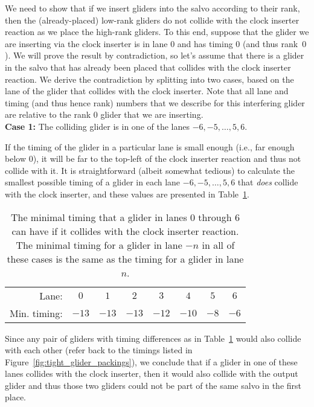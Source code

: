 We need to show that if we insert gliders into the salvo according to their rank, then the (already-placed) low-rank gliders do not collide with the clock inserter reaction as we place the high-rank gliders. To this end, suppose that the glider we are inserting via the clock inserter is in lane $0$ and has timing $0$ (and thus rank~$0$). We will prove the result by contradiction, so let's assume that there is a glider in the salvo that has already been placed that collides with the clock inserter reaction. We derive the contradiction by splitting into two cases, based on the lane of the glider that collides with the clock inserter. Note that all lane and timing (and thus hence rank) numbers that we describe for this interfering glider are relative to the rank $0$ glider that we are inserting. \\

\noindent \textbf{Case 1:} The colliding glider is in one of the lanes $-6, -5, \ldots, 5, 6$.

If the timing of the glider in a particular lane is small enough (i.e., far enough below $0$), it will be far to the top-left of the clock inserter reaction and thus not collide with it. It is straightforward (albeit somewhat tedious) to calculate the smallest possible timing of a glider in each lane $-6, -5, \ldots, 5, 6$ that \emph{does} collide with the clock inserter, and these values are presented in Table~\ref{tab:clock_inserter_ranks}.

\begin{table}[!htb]
	\begin{center}		
		\begin{tabular}{r c c c c c c c}
			\toprule
			Lane: & $0$ & $1$ & $2$ & $3$ & $4$ & $5$ & $6$ \\
			\rowcolor{gray!20} Min. timing: & $-13$ & $-13$ & $-13$ & $-12$ & $-10$ & $-8$ & $-6$ \\\bottomrule
		\end{tabular}
		\caption{The minimal timing that a glider in lanes $0$ through $6$ can have if it collides with the clock inserter reaction. The minimal timing for a glider in lane $-n$ in all of these cases is the same as the timing for a glider in lane $n$.}\label{tab:clock_inserter_ranks}
	\end{center}
\end{table}

Since any pair of gliders with timing differences as in Table~\ref{tab:clock_inserter_ranks} would also collide with each other (refer back to the timings listed in Figure~\ref{fig:tight_glider_packings}), we conclude that if a glider in one of these lanes collides with the clock inserter, then it would also collide with the output glider and thus those two gliders could not be part of the same salvo in the first place. \\


